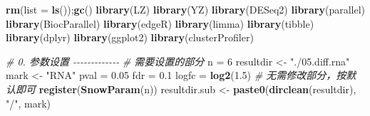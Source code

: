 \documentclass[
]{book}
\newenvironment{Shaded}{\begin{snugshade}}{\end{snugshade}}
\newcommand{\AttributeTok}[1]{\textcolor[rgb]{0.13,0.29,0.53}{#1}}
\newcommand{\CommentTok}[1]{\textcolor[rgb]{0.56,0.35,0.01}{\textit{#1}}}
\newcommand{\DecValTok}[1]{\textcolor[rgb]{0.00,0.00,0.81}{#1}}
\newcommand{\FloatTok}[1]{\textcolor[rgb]{0.00,0.00,0.81}{#1}}
\newcommand{\FunctionTok}[1]{\textcolor[rgb]{0.13,0.29,0.53}{\textbf{#1}}}
\newcommand{\NormalTok}[1]{#1}
\newcommand{\OtherTok}[1]{\textcolor[rgb]{0.56,0.35,0.01}{#1}}
\newcommand{\StringTok}[1]{\textcolor[rgb]{0.31,0.60,0.02}{#1}}
\begin{document}
\begin{Shaded}
\begin{Highlighting}[]
\FunctionTok{rm}\NormalTok{(}\AttributeTok{list =} \FunctionTok{ls}\NormalTok{());}\FunctionTok{gc}\NormalTok{()}
\FunctionTok{library}\NormalTok{(LZ)}
\FunctionTok{library}\NormalTok{(YZ)}
\FunctionTok{library}\NormalTok{(DESeq2)}
\FunctionTok{library}\NormalTok{(parallel)}
\FunctionTok{library}\NormalTok{(BiocParallel)}
\FunctionTok{library}\NormalTok{(edgeR)}
\FunctionTok{library}\NormalTok{(limma)}
\FunctionTok{library}\NormalTok{(tibble)}
\FunctionTok{library}\NormalTok{(dplyr)}
\FunctionTok{library}\NormalTok{(ggplot2)}
\FunctionTok{library}\NormalTok{(clusterProfiler)}

\CommentTok{\# 0. 参数设置 {-}{-}{-}{-}{-}{-}{-}{-}{-}{-}{-}{-}{-}}
\CommentTok{\# 需要设置的部分}
\NormalTok{n }\OtherTok{=} \DecValTok{6}
\NormalTok{resultdir }\OtherTok{\textless{}{-}} \StringTok{"./05.diff.rna"}
\NormalTok{mark }\OtherTok{\textless{}{-}} \StringTok{"RNA"}
\NormalTok{pval }\OtherTok{=} \FloatTok{0.05}
\NormalTok{fdr }\OtherTok{=} \FloatTok{0.1}
\NormalTok{logfc }\OtherTok{=} \FunctionTok{log2}\NormalTok{(}\FloatTok{1.5}\NormalTok{)}
\CommentTok{\# 无需修改部分，按默认即可}
\FunctionTok{register}\NormalTok{(}\FunctionTok{SnowParam}\NormalTok{(n))}
\NormalTok{resultdir.sub }\OtherTok{\textless{}{-}} \FunctionTok{paste0}\NormalTok{(}\FunctionTok{dirclean}\NormalTok{(resultdir), }\StringTok{"/"}\NormalTok{, mark)}


\end{Highlighting}
\end{Shaded}
\end{document}
